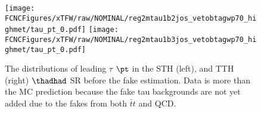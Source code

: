 \begin{figure}[H]
\centering
\texttt{[image: \\FCNCFigures/xTFW/raw/NOMINAL/reg2mtau1b2jos\_vetobtagwp70\_highmet/tau\_pt\_0.pdf]}
\texttt{[image: \\FCNCFigures/xTFW/raw/NOMINAL/reg2mtau1b3jos\_vetobtagwp70\_highmet/tau\_pt\_0.pdf]}
\caption{ The distributions of leading $\tau$ $\pt$ in the STH (left), and TTH (right) $\thadhad$ SR before the fake estimation. Data is more than the MC prediction because the fake tau backgrounds are not yet added due to the fakes from both $\bar{t}t$ and QCD.}
\label{fig:intro_os_pre_hadhad}
\end{figure}

